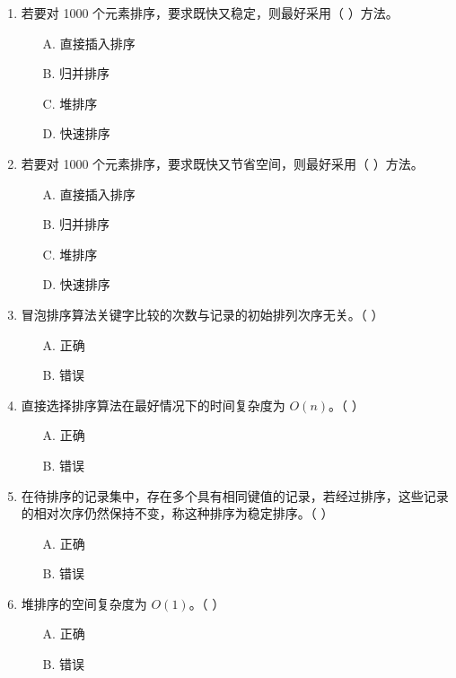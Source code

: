 \documentclass[12pt, a4paper]{article}
\begin{document}
\begin{enumerate}[label=\arabic*.]
	\item 若要对 1000 个元素排序，要求既快又稳定，则最好采用（ ）方法。
	      \begin{enumerate}
		      \item[A.] 直接插入排序
		      \item[B.] 归并排序
		      \item[C.] 堆排序
		      \item[D.] 快速排序
	      \end{enumerate}

	\item 若要对 1000 个元素排序，要求既快又节省空间，则最好采用（ ）方法。
	      \begin{enumerate}
		      \item[A.] 直接插入排序
		      \item[B.] 归并排序
		      \item[C.] 堆排序
		      \item[D.] 快速排序
	      \end{enumerate}

	\item 冒泡排序算法关键字比较的次数与记录的初始排列次序无关。（ ）
	      \begin{enumerate}
		      \item[A.] 正确
		      \item[B.] 错误
	      \end{enumerate}

	\item 直接选择排序算法在最好情况下的时间复杂度为 $O(n)$。（ ）
	      \begin{enumerate}
		      \item[A.] 正确
		      \item[B.] 错误
	      \end{enumerate}

	\item 在待排序的记录集中，存在多个具有相同键值的记录，若经过排序，这些记录的相对次序仍然保持不变，称这种排序为稳定排序。（ ）
	      \begin{enumerate}
		      \item[A.] 正确
		      \item[B.] 错误
	      \end{enumerate}

	\item 堆排序的空间复杂度为 $O(1)$。（ ）
	      \begin{enumerate}
		      \item[A.] 正确
		      \item[B.] 错误
	      \end{enumerate}


\end{enumerate}
\end{document}
